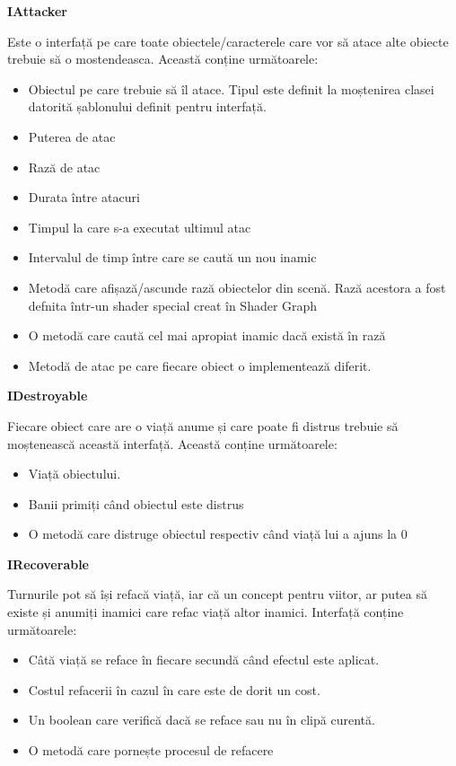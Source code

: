 \documentclass[12pt, a4paper]{article}
\begin{document}
	
	\textbf{IAttacker}
	
	Este o interfață pe care toate obiectele/caracterele care vor să atace alte obiecte trebuie să o mostendeasca. Această conține următoarele:
	
	\begin{itemize}
		\item Obiectul pe care trebuie să îl atace. Tipul este definit la moștenirea clasei datorită șablonului definit pentru interfață.
		\item Puterea de atac
		\item Rază de atac
		\item Durata între atacuri
		\item Timpul la care s-a executat ultimul atac
		\item Intervalul de timp între care se caută un nou inamic
		\item Metodă care afișază/ascunde rază obiectelor din scenă. Rază acestora a fost defnita într-un shader special creat în Shader Graph
		\item O metodă care caută cel mai apropiat inamic dacă există în rază
		\item Metodă de atac pe care fiecare obiect o implementează diferit.
	\end{itemize}
	\bigskip
	
	\textbf{IDestroyable}
	
	Fiecare obiect care are o viață anume și care poate fi distrus trebuie să moștenească această interfață. Această conține următoarele:
	
	\begin{itemize}
		\item Viață obiectului.
		\item Banii primiți când obiectul este distrus
		\item O metodă care distruge obiectul respectiv când viață lui a ajuns la 0
	\end{itemize}
	\bigskip
	
	\textbf{IRecoverable}
	
	Turnurile pot să își refacă viață, iar că un concept pentru viitor, ar putea să existe și anumiți inamici care refac viață altor inamici. Interfață conține următoarele:
	
	\begin{itemize}
		\item Câtă viață se reface în fiecare secundă când efectul este aplicat.
		\item Costul refacerii în cazul în care este de dorit un cost.
		\item Un boolean care verifică dacă se reface sau nu în clipă curentă.
		\item O metodă care pornește procesul de refacere
	\end{itemize}
	
\end{document}
